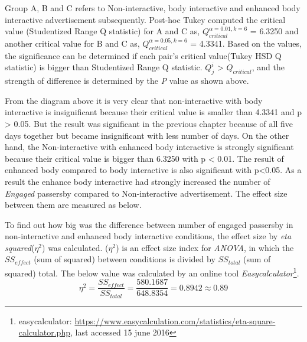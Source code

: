 \begin{enumerate}
\begin{table}[H]
\caption{Post-Hoc Tukey’s HSD}
\label{tab:engage-non-posthoctukey}
\centering
{}
\end{table}


Group A, B and C refers to Non-interactive, body interactive and enhanced body interactive advertisement subsequently. Post-hoc Tukey computed the critical value (Studentized Range Q statistic) for A and C as, ${Q}_{critical}^{\alpha=0.01,k=6}$ = 6.3250 and another critical value for B and C as, ${Q}_{critical}^{\alpha=0.05,k=6}$ = 4.3341. Based on the values, the significance can be determined if each pair’s critical value(Tukey HSD Q statistic) is bigger than Studentized Range Q statistic. ${Q}_{j}^{i }$ > ${Q}_{critical}$, and the strength of difference is determined by the \emph{P} value as shown above. 

From the diagram above it is very clear that non-interactive with body interactive is insignificant because their critical value is smaller than 4.3341 and p > 0.05. But the result was significant in the previous chapter because of all five days together but became insignificant with less number of days. On the other hand, the Non-interactive with enhanced body interactive is strongly significant because their critical value is bigger than 6.3250 with p < 0.01. The result of enhanced body compared to body interactive is also significant with p<0.05. As a result the enhance body interactive had strongly increased the number of \emph{Engaged} passersby compared to Non-interactive advertisement. The effect size between them are measured as below.

To find out how big was the difference between number of engaged passersby in non-interactive and enhanced body interactive conditions, the effect size by \emph{eta squared}(${\eta}^2$) was calculated. (${\eta}^2$) is an effect size index for \emph{ANOVA}, in which the $SS_{effect}$ (sum of squared) between conditions is divided by $SS_{total}$  (sum of squared) total. The below value was calculated by an online tool \emph{Easycalculator}\footnote{easycalculator: \url{https://www.easycalculation.com/statistics/eta-square-calculator.php}, last accessed 15 june 2016}.
\[
{\eta}^2 = \frac{{SS}_{effect}}{{SS}_{total}} = \frac{580.1687}{648.8354} = 0.8942\approx 0.89
\]


\end{enumerate}
